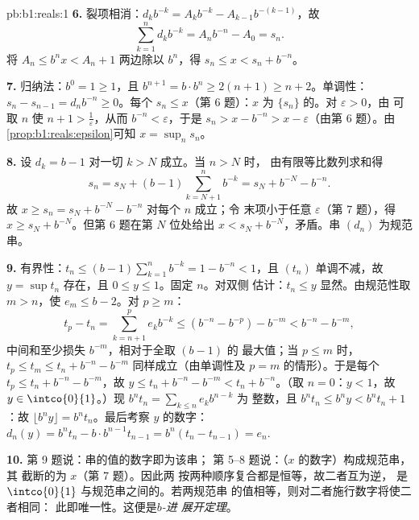 \begin{solution}{pb:b1:reals:1}
\textbf{6.} 裂项相消：$d_k b^{-k} = A_k b^{-k} - A_{k-1}
b^{-(k-1)}$，故
\[
\sum_{k=1}^n d_k b^{-k} = A_n b^{-n} - A_0 = s_n .
\]
将 $A_n \leq b^n x < A_n + 1$ 两边除以 $b^n$，得 $s_n \leq x <
s_n + b^{-n}$。

\textbf{7.} 归纳法：$b^0 = 1 \geq 1$，且 $b^{n+1} = b \cdot
b^n \geq 2(n + 1) \geq n + 2$。单调性：$s_n - s_{n-1} = d_n
b^{-n} \geq 0$。每个 $s_n \leq x$（第 6 题）：$x$ 为
$\{s_n\}$ 的。对 $\varepsilon > 0$，由
可取 $n$ 使 $n + 1 > \frac1\varepsilon$，从而
$b^{-n} < \varepsilon$，于是 $s_n > x - b^{-n} > x -
\varepsilon$（由第 6 题）。由\cref{prop:b1:reals:epsilon}可知 $x =
\sup_n s_n$。

\textbf{8.} 设 $d_k = b - 1$ 对一切 $k > N$ 成立。当 $n > N$ 时，
由有限等比数列求和得
\[
s_n = s_N + (b - 1)\sum_{k=N+1}^{n} b^{-k}
= s_N + b^{-N} - b^{-n} .
\]
故 $x \geq s_n = s_N + b^{-N} - b^{-n}$ 对每个 $n$ 成立；令
末项小于任意 $\varepsilon$（第 7 题），得 $x
\geq s_N + b^{-N}$。但第 6 题在第 $N$ 位处给出 $x < s_N +
b^{-N}$，矛盾。串 $(d_n)$ 为规范串。

\textbf{9.} 有界性：$t_n \leq (b-1)\sum_{k=1}^n b^{-k} = 1 -
b^{-n} < 1$，且 $(t_n)$ 单调不减，故 $y = \sup t_n$
存在，且 $0 \leq y \leq 1$。固定 $n$。对双侧
估计：$t_n \leq y$ 显然。由规范性取 $m > n$，使
$e_m \leq b - 2$。对 $p \geq m$：
\[
t_p - t_n = \sum_{k=n+1}^{p} e_k b^{-k}
\leq (b^{-n} - b^{-p}) - b^{-m} < b^{-n} - b^{-m},
\]
中间和至少损失 $b^{-m}$，相对于全取 $(b-1)$ 的
最大值；当 $p \leq m$ 时，$t_p \leq t_m \leq t_n + b^{-n} -
b^{-m}$ 同样成立（由单调性及 $p = m$ 的情形）。于是每个
$t_p \leq t_n + b^{-n} - b^{-m}$，故 $y \leq t_n + b^{-n} -
b^{-m} < t_n + b^{-n}$。（取 $n = 0$：$y < 1$，故 $y \in
\intco{0}{1}$。）现 $b^n t_n = \sum_{k \leq n} e_k b^{n-k}$ 为
整数，且 $b^n t_n \leq b^n y < b^n t_n + 1$：故 $\lfloor b^n
y \rfloor = b^n t_n$。最后考察 $y$ 的数字：$d_n(y) = b^n
t_n - b \cdot b^{n-1} t_{n-1} = b^n(t_n - t_{n-1}) = e_n$.

\textbf{10.} 第 9 题说：串的值的数字即为该串；
第 5--8 题说：（$x$ 的数字）构成规范串，其
截断的为 $x$（第 7 题）。因此两
按两种顺序复合都是恒等，故二者互为逆，
是 $\intco{0}{1}$ 与规范串之间的。若两规范串
的值相等，则对二者施行数字将使二者相同：
此即唯一性。这便是\emph{$b$-进
展开定理}。


\end{solution}
